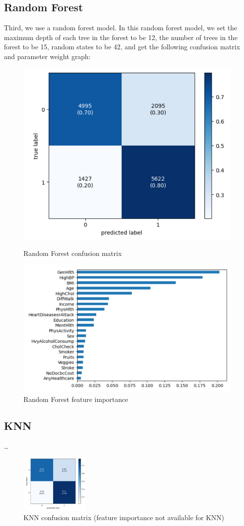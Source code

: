 \documentclass[12pt]{article}
\begin{document}
\subsection{Random Forest}
Third, we use a random forest model. In this random forest model, we set the maximum depth of each tree in the forest to be 12, the number of trees in the forest to be 15, random states to be 42, and get the following confusion matrix and parameter weight graph:
\begin{figure}[H]
  \centering
  \begin{minipage}[b]{0.45\textwidth}
    \centering
    \includegraphics[width=0.7\linewidth]{ranfor_cm.png}
    \caption{Random Forest confusion matrix}
  \end{minipage}\hfill
  \begin{minipage}[b]{0.45\textwidth}
    \centering
    \includegraphics[width=0.7\linewidth]{ranfor_w.png}
    \caption{Random Forest feature importance}
  \end{minipage}
\end{figure}

\subsection{KNN}
\ldots
\begin{figure}[H]
  \centering
  \includegraphics[width=0.3\textwidth]{knn_cm.png}
  \caption{KNN confusion matrix (feature importance not available for KNN)}
  \label{fig:knn}
\end{figure}
\end{document}
